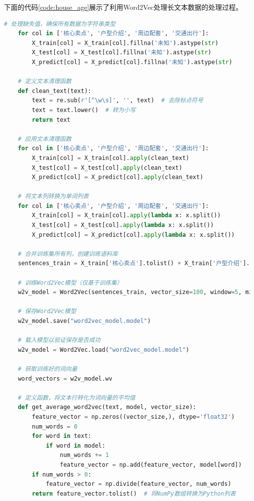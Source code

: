 \documentclass[
    report,     %
    oneside,    %
    UTF8,       %
    zihao=-4    %
]{config} %
\begin{document}
下面的代码\ref{code:house_age}展示了利用Word2Vec处理长文本数据的处理过程。
\begin{lstlisting}[label=code:word2vec, language=Python, caption=Word2Vec处理长文本数据的处理代码]
    # 处理缺失值，确保所有数据为字符串类型
    for col in ['核心卖点', '户型介绍', '周边配套', '交通出行']:
        X_train[col] = X_train[col].fillna('未知').astype(str)
        X_test[col] = X_test[col].fillna('未知').astype(str)
        X_predict[col] = X_predict[col].fillna('未知').astype(str)
    
    # 定义文本清理函数
    def clean_text(text):
        text = re.sub(r'[^\w\s]', '', text)  # 去除标点符号
        text = text.lower()  # 转为小写
        return text
    
    # 应用文本清理函数
    for col in ['核心卖点', '户型介绍', '周边配套', '交通出行']:
        X_train[col] = X_train[col].apply(clean_text)
        X_test[col] = X_test[col].apply(clean_text)
        X_predict[col] = X_predict[col].apply(clean_text)
    
    # 将文本列转换为单词列表
    for col in ['核心卖点', '户型介绍', '周边配套', '交通出行']:
        X_train[col] = X_train[col].apply(lambda x: x.split())
        X_test[col] = X_test[col].apply(lambda x: x.split())
        X_predict[col] = X_predict[col].apply(lambda x: x.split())
    
    # 合并训练集所有列，创建训练语料库
    sentences_train = X_train['核心卖点'].tolist() + X_train['户型介绍'].tolist() + X_train['周边配套'].tolist() + X_train['交通出行'].tolist()
    
    # 训练Word2Vec模型（仅基于训练集）
    w2v_model = Word2Vec(sentences_train, vector_size=100, window=5, min_count=1, workers=4)
    
    # 保存Word2Vec模型
    w2v_model.save("word2vec_model.model")
    
    # 载入模型以验证保存是否成功
    w2v_model = Word2Vec.load("word2vec_model.model")
    
    # 获取训练好的词向量
    word_vectors = w2v_model.wv
    
    # 定义函数，将文本行转化为词向量的平均值
    def get_average_word2vec(text, model, vector_size):
        feature_vector = np.zeros((vector_size,), dtype='float32')
        num_words = 0
        for word in text:
            if word in model:
                num_words += 1
                feature_vector = np.add(feature_vector, model[word])
        if num_words > 0:
            feature_vector = np.divide(feature_vector, num_words)
        return feature_vector.tolist()  # 将NumPy数组转换为Python列表
    

\end{lstlisting}
\end{document}
